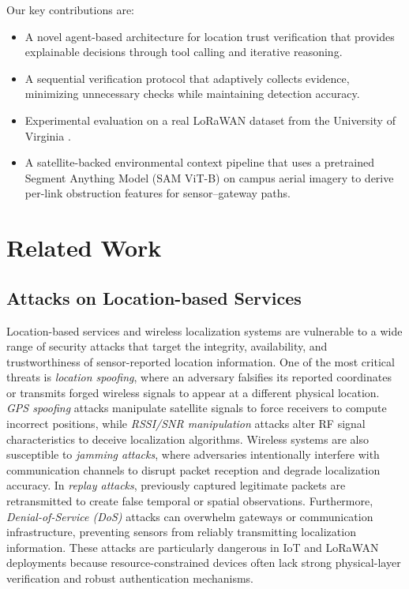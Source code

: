 \documentclass[10pt, twocolumn, letterpaper]{article}
\begin{document}
Our key contributions are:
\begin{itemize}
    \item A novel agent-based architecture for location trust verification that provides explainable decisions through tool calling and iterative reasoning.
 
    \item A sequential verification protocol that adaptively collects evidence, minimizing unnecessary checks while maintaining detection accuracy.
    \item Experimental evaluation on a real LoRaWAN dataset from the University of Virginia \cite{lorawandataset}. 


    \item A satellite-backed environmental context pipeline that uses a pretrained Segment Anything Model (SAM ViT-B) \cite{sam} on campus aerial imagery to derive per-link obstruction features for sensor--gateway paths.
    
\end{itemize}

\section{Related Work}

\subsection{Attacks on Location-based Services}

Location-based services and wireless localization systems are vulnerable to a wide range of security attacks that target the integrity, availability, and trustworthiness of sensor-reported location information. One of the most critical threats is \textit{location spoofing}, where an adversary falsifies its reported coordinates or transmits forged wireless signals to appear at a different physical location. \textit{GPS spoofing} attacks manipulate satellite signals to force receivers to compute incorrect positions, while \textit{RSSI/SNR manipulation} attacks alter RF signal characteristics to deceive localization algorithms. Wireless systems are also susceptible to \textit{jamming attacks}, where adversaries intentionally interfere with communication channels to disrupt packet reception and degrade localization accuracy. In \textit{replay attacks}, previously captured legitimate packets are retransmitted to create false temporal or spatial observations. Furthermore, \textit{Denial-of-Service (DoS)} attacks can overwhelm gateways or communication infrastructure, preventing sensors from reliably transmitting localization information. These attacks are particularly dangerous in IoT and LoRaWAN deployments because resource-constrained devices often lack strong physical-layer verification and robust authentication mechanisms. 
\end{document}
